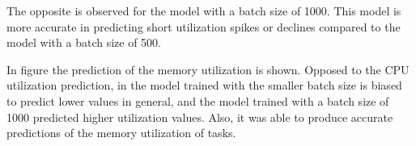   The opposite is observed for the model with a batch size of 1000. 
  This model is more accurate in predicting short utilization spikes or declines compared to the model with a batch size of 500.
  


  In figure 
  the prediction of the memory utilization is shown.
  Opposed to the CPU utilization prediction, in the model trained with the smaller batch size is biased to predict lower values in general, and the model trained with a batch size of 1000 predicted higher utilization values. Also, it was able to produce accurate predictions of the memory utilization of tasks.
  

  


    



